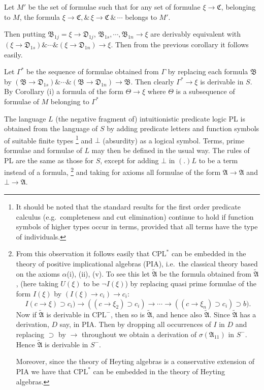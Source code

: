 \documentclass[12pt,a4paper]{article}
\begin{document}
\noindent
Let $M'$ be the set of formulae such that for any set of formulae $ξ \to \mathfrak{C}$,
belonging to $M$, the formula $\xi \to \mathfrak{C}, \&\, \xi \to \mathfrak{C}\, \& \,
\cdots$ belongs to $M'$.

Then putting $\mathfrak{B}_{1j} = \xi \to \mathfrak{D}_{1j}$,
$\mathfrak{B}_{1s}, \cdots, \mathfrak{B}_{1n} \to \xi$ are derivably
equivalent with $(\xi \to \mathfrak{D}_{1s}) \& \cdots \& (\xi \to \mathfrak{D}_{1n})
\to \xi$. Then from the previous corollary it follows easily.

Let $\Gamma^*$ be the sequence of formulae obtained from $\Gamma$ by replacing
each formula $\mathfrak{B}$ by $(\mathfrak{B} \to \mathfrak{D}_{1s}) \&
\cdots \& (\mathfrak{B} \to \mathfrak{D}_{1n}) \to \mathfrak{B}$. Then clearly
$\Gamma^* \to \xi$ is derivable in $S$. By Corollary (i) a formula of the
form $\Theta \to \xi$ where $\Theta$ is a subsequence of formulae of
$M$ belonging to $\Gamma^*$

\bigskip
\noindent
The language $L$ (the negative fragment of) intuitionistic predicate logic PL
is obtained from the language of $S$ by adding predicate letters and function
symbols of suitable finite types%
\footnote{It should be noted that the standard results for the first order
predicate calculus (e.g.\ completeness and cut elimination) continue to hold
if function symbols of higher types occur in terms, provided that all terms
have the type of individuals.}
and $\bot$ (absurdity) as a logical symbol. Terms, prime formulae and formulae
of $L$ may then be defined in the usual way. The rules of PL are the same as
those for $S$, except for adding $\bot$ in $(.)L$ to be a term instead of a
formula,%
\footnote{From this observation it follows easily that $\mathrm{CPL}^*$ can be
embedded in the theory of positive implicational algebras (PIA), i.e.\ the
classical theory based on the axioms $\alpha$(i), (ii), (v). To see this let
$\tilde{\mathfrak{A}}$ be the formula obtained from $\tilde{\mathfrak{A}}$,
(here taking $U(\xi)$ to be $\neg I(\xi)$) by replacing quasi prime formulae
of the form $I(\xi)$ by $(I(\xi) \to c_i) \to c_i$:
\[
I(c \to \xi) \supset c_i) \to ((c \to \xi_2) \supset c_i) \to \cdots
\to ((c \to \xi_n) \supset c_i) \supset b).
\]
Now if $\tilde{\mathfrak{A}}$ is derivable in $\mathrm{CPL}^-$, then so is
$\tilde{\mathfrak{A}}$, and hence also $\tilde{\mathfrak{A}}$. Since $\tilde{\mathfrak{A}}$
has a derivation, $D$ say, in PIA. Then by dropping all occurrences of $I$
in $D$ and replacing $\supset$ by $\to$ throughout we obtain a derivation of
$\sigma(\mathfrak{A}_{11})$ in $S^-$. Hence $\tilde{\mathfrak{A}}$ is derivable
in $S^-$.

Moreover, since the theory of Heyting algebras is a conservative extension of
PIA we have that $\mathrm{CPL}^*$ can be embedded in the theory of Heyting
algebras.}
and taking for axioms all formulae of the form $\mathfrak{A} \to \mathfrak{A}$
and $\bot \to \mathfrak{A}$.
\end{document}
